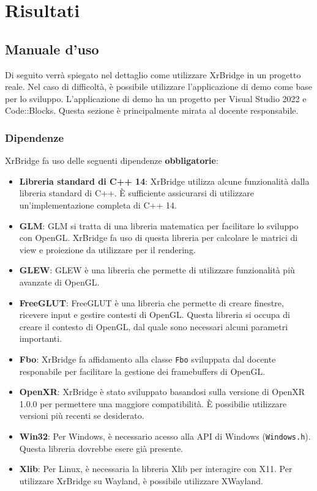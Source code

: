 \documentclass[twoside]{supsistudent}
\begin{document}
\chapter{Risultati}


\section{Manuale d'uso}

Di seguito verrà spiegato nel dettaglio come utilizzare XrBridge in un progetto reale. Nel caso di difficoltà, è possibile utilizzare l'applicazione di demo come base per lo sviluppo. L'applicazione di demo ha un progetto per Visual Studio 2022 e Code::Blocks. Questa sezione è principalmente mirata al docente responsabile.

\subsection{Dipendenze}

XrBridge fa uso delle seguenti dipendenze \textbf{obbligatorie}:

\begin{itemize}
  \item \textbf{Libreria standard di C++ 14}: XrBridge utilizza alcune funzionalità dalla libreria standard di C++. È sufficiente assicurarsi di utilizzare un'implementazione completa di C++ 14.
  \item \textbf{GLM}: GLM si tratta di una libreria matematica per facilitare lo sviluppo con OpenGL. XrBridge fa uso di questa libreria per calcolare le matrici di view e proiezione da utilizzare per il rendering.
  \item \textbf{GLEW}: GLEW è una libreria che permette di utilizzare funzionalità più avanzate di OpenGL.
  \item \textbf{FreeGLUT}: FreeGLUT è una libreria che permette di creare finestre, ricevere input e gestire contesti di OpenGL. Questa libreria si occupa di creare il contesto di OpenGL, dal quale sono necessari alcuni parametri importanti.
  \item \textbf{Fbo}: XrBridge fa affidamento alla classe \texttt{Fbo} sviluppata dal docente responabile per facilitare la gestione dei framebuffers di OpenGL.
  \item \textbf{OpenXR}: XrBridge è stato sviluppato basandosi sulla versione di OpenXR 1.0.0 per permettere una maggiore compatibilità. È possibilie utilizzare versioni più recenti se desiderato.
  \item \textbf{Win32}: Per Windows, è necessario acesso alla API di Windows (\texttt{Windows.h}). Questa libreria dovrebbe esere già presente.
  \item \textbf{Xlib}: Per Linux, è necessaria la libreria Xlib per interagire con X11. Per utilizzare XrBridge su Wayland, è possibile utilizzare XWayland.
\end{itemize}
\end{document}
